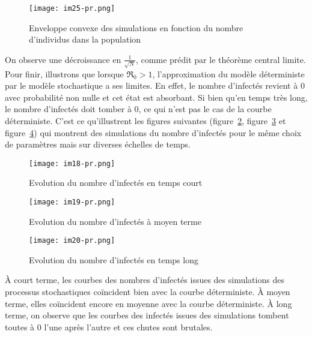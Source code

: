 \documentclass[a4paper,10.9pt]{article}
\newcommand{\R}{\mathfrak{R}_0}
\begin{document}
\begin{figure}[h!]
  \centering
  \texttt{[image: im25-pr.png]} %
  \caption{Enveloppe convexe des simulations en fonction du nombre d'individus dans la population}
  \label{fig:env_conv}
\end{figure}

On observe une décroissance en $\frac{1}{\sqrt{N}}$, comme prédit par le théorème central limite. \\

Pour finir, illustrons que lorsque $\R >1$, l'approximation du modèle déterministe par le modèle stochastique a ses limites. En effet, le nombre d'infectés revient à $0$ avec probabilité non nulle et cet état est absorbant. Si bien qu'en temps très long, le nombre d'infectés doit tomber à $0$, ce qui n'est pas le cas de la courbe déterministe. C'est ce qu'illustrent les figures suivantes (figure~\ref{fig:nb_inf_court}, figure~\ref{fig:nb_inf_moyen_terme} et figure~\ref{fig:nb_inf_long}) qui montrent des simulations du nombre d'infectés pour le même choix de paramètres mais sur diverses échelles de temps.

\begin{figure}[h!]
  \centering
  \texttt{[image: im18-pr.png]} %
  \caption{Evolution du nombre d'infectés en temps court}
  \label{fig:nb_inf_court}
\end{figure}


\begin{figure}[h!]
  \centering
  \texttt{[image: im19-pr.png]} %
  \caption{Evolution du nombre d'infectés à moyen terme}
  \label{fig:nb_inf_moyen_terme}
\end{figure}

\begin{figure}[h!]
  \centering
  \texttt{[image: im20-pr.png]} %
  \caption{Evolution du nombre d'infectés en temps long}
  \label{fig:nb_inf_long}
\end{figure}
À court terme, les courbes des nombres d'infectés issues des simulations des processus stochastiques coïncident bien avec la courbe déterministe. À moyen terme, elles coïncident encore en moyenne avec la courbe déterministe. À long terme, on observe que les courbes des infectés issues des simulations tombent toutes à $0$ l'une après l'autre et ces chutes sont brutales.
\end{document}
